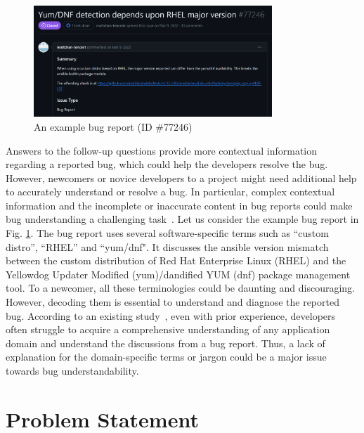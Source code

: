 \begin{figure}[!htpb]
  \centering
  \includegraphics[width=0.8\textwidth]{images/not_readable_bug_report.png}
  \caption{ An example bug report (ID \#77246)}
  \label{Intro-fig:notreadbleBR}
\end{figure}

Answers to the follow-up questions provide more contextual information regarding a reported bug, which could help the developers resolve the bug. However, newcomers or novice developers to a project might need additional help to accurately understand or resolve a bug. In particular, complex contextual information and the incomplete or inaccurate content in bug reports could make bug understanding a challenging task~\cite{velly2013towards}. Let us consider the example bug report in Fig. \ref{Intro-fig:notreadbleBR}. The bug report uses several software-specific terms such as ``custom distro'', ``RHEL'' and ``yum/dnf". It discusses the ansible version mismatch between the custom distribution of Red Hat Enterprise Linux (RHEL) and the Yellowdog Updater Modified (yum)/dandified YUM (dnf) package management tool. To a newcomer, all these terminologies could be daunting and discouraging. However, decoding them is essential to understand and diagnose the reported bug. 
According to an existing study~\cite{guizani2021long}, even with prior experience, developers often struggle to acquire a comprehensive understanding of any application domain and understand the discussions from a bug report. Thus, a lack of explanation for the domain-specific terms or jargon could be a major issue towards bug understandability.

\section{Problem Statement}

